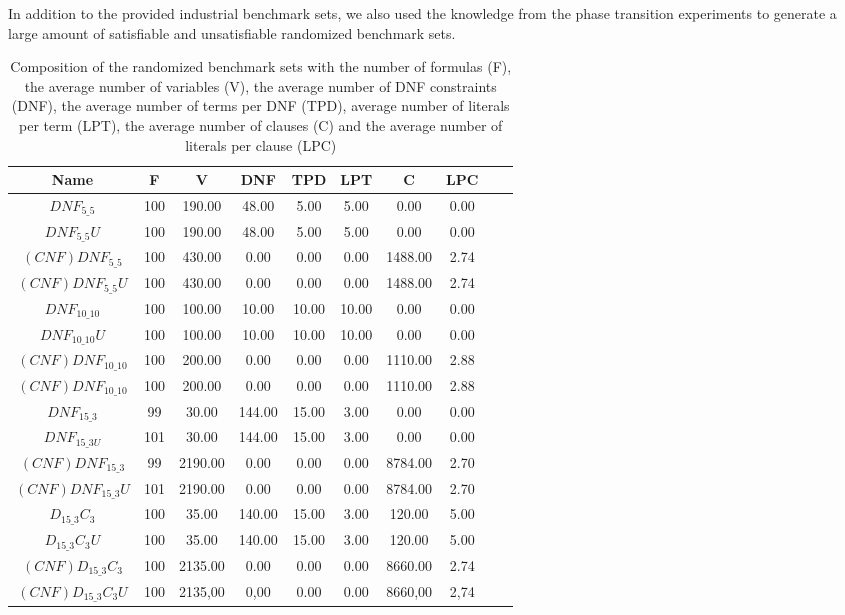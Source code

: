 In addition to the provided industrial benchmark sets, we also used the knowledge from the phase transition experiments to generate a large amount of satisfiable and unsatisfiable randomized benchmark sets.

\begin{table}[!htb]
\centering
\caption[Composition of the randomized benchmark sets]{Composition of the randomized benchmark sets with the number of formulas (F), the average number of variables (V), the average number of DNF constraints (DNF), the average number of terms per DNF (TPD), average number of literals per term (LPT), the average number of clauses (C) and the average number of literals per clause (LPC)}
\label{tab:randomizedBenchmarks}
\begin{tabular}{|c|c|c|c|c|c|c|c|c|c|}
\hline
Name & F & V & DNF & TPD & LPT & C & LPC \\
\hline
$DNF_{5\_5}$ & 100 & 190.00 & 48.00 & 5.00 & 5.00 & 0.00 & 0.00 \\ 
 \hline 
$DNF_{5\_5}U$ & 100 & 190.00 & 48.00 & 5.00 & 5.00 & 0.00 & 0.00 \\ 
 \hline 
$(CNF)DNF_{5\_5}$ & 100 & 430.00 & 0.00 & 0.00 & 0.00 & 1488.00 & 2.74 \\ 
 \hline 
$(CNF)DNF_{5\_5}U$ & 100 & 430.00 & 0.00 & 0.00 & 0.00 & 1488.00 & 2.74 \\ 
 \hline 
 $DNF_{10\_10}$ & 100 & 100.00 & 10.00 & 10.00 & 10.00 & 0.00 & 0.00 \\ 
 \hline 
$DNF_{10\_10}U$ & 100 & 100.00 & 10.00 & 10.00 & 10.00 & 0.00 & 0.00 \\ 
 \hline 
$(CNF)DNF_{10\_10}$ & 100 & 200.00 & 0.00 & 0.00 & 0.00 & 1110.00 & 2.88 \\ 
 \hline 
$(CNF)DNF_{10\_10}$ & 100 & 200.00 & 0.00 & 0.00 & 0.00 & 1110.00 & 2.88 \\ 
\hline
$DNF_{15\_3}$ & 99 & 30.00 & 144.00 & 15.00 & 3.00 & 0.00 & 0.00\\ 
 \hline 
$DNF_{15\_3U}$ & 101 & 30.00 & 144.00 & 15.00 & 3.00 & 0.00 & 0.00  \\ 
 \hline 
$(CNF)DNF_{15\_3}$ & 99 & 2190.00 & 0.00 & 0.00 & 0.00 & 8784.00 & 2.70 \\ 
 \hline 
$(CNF)DNF_{15\_3}U$ & 101 & 2190.00 & 0.00 & 0.00 & 0.00 & 8784.00 & 2.70 \\ 
 \hline
$D_{15\_3}C_3$ & 100 & 35.00 & 140.00 & 15.00 & 3.00 & 120.00 & 5.00 \\ 
 \hline 
$D_{15\_3}C_3U$ & 100 & 35.00 & 140.00 & 15.00 & 3.00 & 120.00 & 5.00 \\ 
 \hline 
$(CNF)D_{15\_3}C_3$ & 100 & 2135.00 & 0.00 & 0.00 & 0.00 & 8660.00 & 2.74 \\ 
 \hline 
$(CNF)D_{15\_3}C_3U$ & 100 & 2135,00 & 0,00 & 0.00 & 0.00 & 8660,00 & 2,74 \\ 
 \hline 
\end{tabular}
\end{table}


